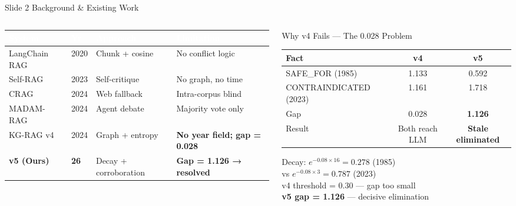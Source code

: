 \documentclass[aspectratio=169, 10pt]{beamer}
\newcommand{\rowV}{\rowcolor{iiitblue!15}}
\newcommand{\rowG}{\rowcolor{green!10}}
\newcommand{\rowR}{\rowcolor{red!10}}
\begin{document}
\begin{frame}{Slide 2 \quad Background \& Existing Work}

\begin{columns}[T]
\begin{column}{0.55\textwidth}
  \centering\scriptsize
  \begin{tabular}{L{2.0cm}C{0.6cm}L{2.0cm}L{2.0cm}}
    \toprule
    \textcolor{white}{\textbf{System}} &
    \textcolor{white}{\textbf{Yr}} &
    \textcolor{white}{\textbf{Approach}} &
    \textcolor{white}{\textbf{Limitation}} \\
    \midrule
    LangChain RAG  & 2020 & Chunk + cosine  & No conflict logic \\[1pt]
    Self-RAG       & 2023 & Self-critique   & No graph, no time \\[1pt]
    CRAG           & 2024 & Web fallback    & Intra-corpus blind \\[1pt]
    MADAM-RAG      & 2024 & Agent debate    & Majority vote only \\[1pt]
    KG-RAG v4      & 2024 & Graph + entropy &
      \textbf{No year field; gap = 0.028} \\[1pt]
    \rowV \textbf{v5 (Ours)} & \textbf{26} &
      Decay + corroboration &
      \textbf{Gap = 1.126 → resolved} \\
    \bottomrule
  \end{tabular}
\end{column}
\begin{column}{0.42\textwidth}
  \begin{block}{\small Why v4 Fails — The 0.028 Problem}
    \scriptsize
    \begin{tabular}{lcc}
      \toprule
      \textbf{Fact} & \textbf{v4} & \textbf{v5} \\
      \midrule
      \rowR SAFE\_FOR (1985)      & 1.133 & 0.592 \\
      \rowG CONTRAINDICATED (2023)& 1.161 & 1.718 \\
      \midrule
      Gap   & \alert{0.028} & \textbf{1.126} \\
      Result& \alert{Both reach LLM} & \textbf{Stale eliminated} \\
      \bottomrule
    \end{tabular}
    \vspace{4pt}

    Decay: $e^{-0.08\times16}=0.278$ (1985)\\
    vs $e^{-0.08\times3}=0.787$ (2023)\\[3pt]
    \alert{v4 threshold = 0.30} — gap too small\\
    \textbf{v5 gap = 1.126} — decisive elimination
  \end{block}
\end{column}
\end{columns}

\end{frame}
\end{document}
